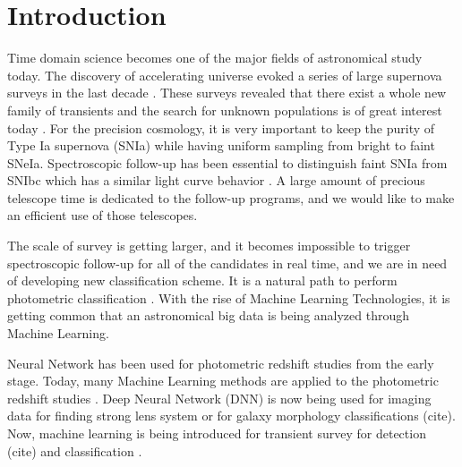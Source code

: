 \documentclass[useamsfonts]{pasj01}
\begin{document}
\section{Introduction}
Time domain science becomes one of the major fields of astronomical study today.  The discovery of accelerating universe \citep{perlmutter99a,riess98a} evoked a series of large supernova surveys in the last decade \citep{astier06b,wood-vasey07a,kessler09a,law09a}.  
These surveys revealed that there exist a whole new family of transients and the search for unknown populations is of great interest today \citep{howell06a,phillips07a,quimby07b}. 
For the precision cosmology, it is very important to keep the purity of Type Ia supernova (SNIa) while having uniform sampling from bright to faint SNeIa.  Spectroscopic follow-up has been essential to distinguish faint SNIa from SNIbc which has a similar light curve behavior \citep{scolnic14a}.   A large amount of precious telescope time is dedicated to the follow-up programs, and we would like to make an efficient use of those telescopes.

The scale of survey is getting larger, and it becomes impossible to trigger spectroscopic follow-up for all of the candidates in real time, and we are in need of developing new classification scheme.  It is a natural path to perform photometric classification \citep{sako11a}.  With the rise of Machine Learning Technologies, it is getting common that an astronomical big data is being analyzed through Machine Learning.   

Neural Network has been used for photometric redshift studies from the early stage.  Today, many Machine Learning methods are applied to the photometric redshift studies \citep{collister04a,carliles10a,pasquet19a}.
Deep Neural Network (DNN) is now being used for imaging data for finding strong lens system \citep{petrillo17a} or for galaxy morphology classifications (cite).  Now, machine learning is being introduced for transient survey for detection (cite) and classification \citep{charnock17a}.
\end{document}
